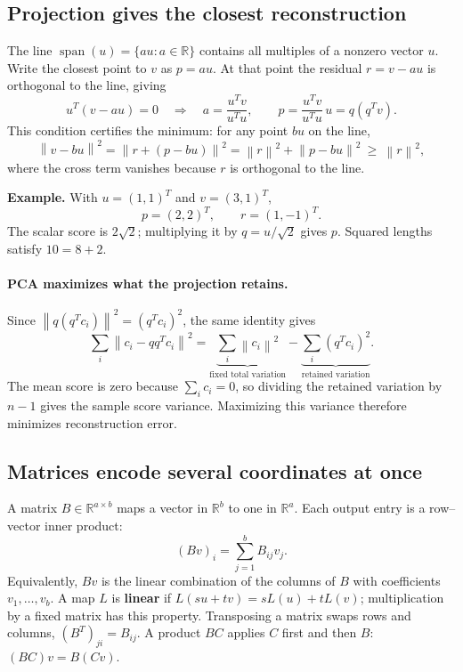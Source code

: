 \documentclass[11pt]{article}
\newcommand{\R}{\mathbb R}
\newcommand{\norm}[1]{\left\lVert#1\right\rVert}
\begin{document}
\subsection{Projection gives the closest reconstruction}
The line $\operatorname{span}(u)=\{au:a\in\R\}$ contains all multiples
of a nonzero vector $u$. Write the closest point to $v$ as $p=au$.
At that point the residual $r=v-au$ is orthogonal to the line, giving
\[
 u^T(v-au)=0
 \quad\Longrightarrow\quad
 a=\frac{u^Tv}{u^Tu},\qquad
 \boxed{p=\frac{u^Tv}{u^Tu}\,u=q(q^Tv).}
\]
This condition certifies the minimum: for any point $bu$ on the line,
\[
 \norm{v-bu}^2=\norm{r+(p-bu)}^2
 =\norm{r}^2+\norm{p-bu}^2\ \geq\ \norm{r}^2,
\]
where the cross term vanishes because $r$ is orthogonal to the line.

\medskip
\noindent\begin{minipage}[c]{0.59\textwidth}
\textbf{Example.} With $u=(1,1)^T$ and $v=(3,1)^T$,
\[
 p=(2,2)^T,\qquad r=(1,-1)^T.
\]
The scalar score is $2\sqrt2$; multiplying it by $q=u/\sqrt2$ gives
$p$. Squared lengths satisfy $10=8+2$.
\end{minipage}\hfill
\begin{minipage}[c]{0.37\textwidth}
\centering
{}
\end{minipage}

\paragraph{PCA maximizes what the projection retains.}
Since $\norm{q(q^Tc_i)}^2=(q^Tc_i)^2$, the same identity gives
\[
 \sum_i\norm{c_i-qq^Tc_i}^2
 =\underbrace{\sum_i\norm{c_i}^2}_{\text{fixed total variation}}
 -\underbrace{\sum_i(q^Tc_i)^2}_{\text{retained variation}}.
\]
The mean score is zero because $\sum_i c_i=0$, so dividing the retained
variation by $n-1$ gives the sample score variance. Maximizing this
variance therefore minimizes reconstruction error.

\newpage
\subsection{Matrices encode several coordinates at once}
A matrix $B\in\R^{a\times b}$ maps a vector in $\R^b$ to one in $\R^a$.
Each output entry is a row--vector inner product:
\[
 (Bv)_i=\sum_{j=1}^b B_{ij}v_j.
\]
Equivalently, $Bv$ is the linear combination of the columns of $B$ with
coefficients $v_1,\ldots,v_b$. A map $L$ is \textbf{linear} if
$L(su+tv)=sL(u)+tL(v)$; multiplication by a fixed matrix has this property.
Transposing a matrix swaps rows and columns, $(B^T)_{ji}=B_{ij}$.
A product $BC$ applies $C$ first and then $B$: $(BC)v=B(Cv)$.
\end{document}
